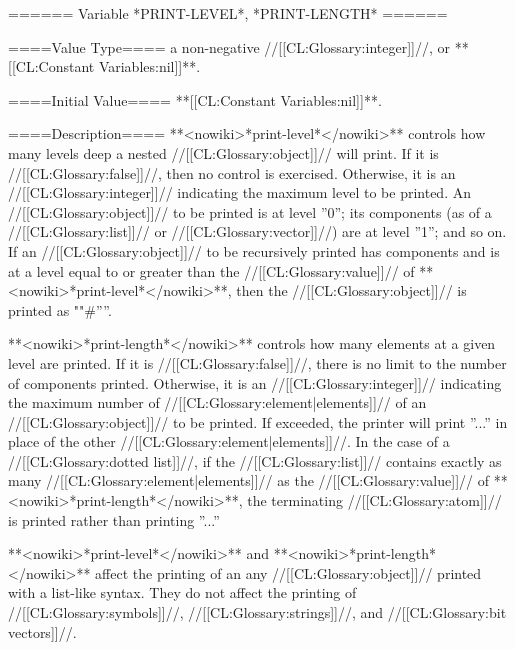 ====== Variable *PRINT-LEVEL*, *PRINT-LENGTH* ======

====Value Type====
a non-negative //[[CL:Glossary:integer]]//, or **[[CL:Constant Variables:nil]]**.

====Initial Value====
**[[CL:Constant Variables:nil]]**.

====Description====
**<nowiki>*print-level*</nowiki>** controls how many levels deep a nested //[[CL:Glossary:object]]// will print. If it is //[[CL:Glossary:false]]//, then no control is exercised. Otherwise, it is an //[[CL:Glossary:integer]]// indicating the maximum level to be printed. An //[[CL:Glossary:object]]// to be printed is at level ''0''; its components (as of a //[[CL:Glossary:list]]// or //[[CL:Glossary:vector]]//) are at level ''1''; and so on. If an //[[CL:Glossary:object]]// to be recursively printed has components and is at a level equal to or greater than the //[[CL:Glossary:value]]// of **<nowiki>*print-level*</nowiki>**, then the //[[CL:Glossary:object]]// is printed as ""#''''.

**<nowiki>*print-length*</nowiki>** controls how many elements at a given level are printed. If it is //[[CL:Glossary:false]]//, there is no limit to the number of components printed. Otherwise, it is an //[[CL:Glossary:integer]]// indicating the maximum number of //[[CL:Glossary:element|elements]]// of an //[[CL:Glossary:object]]// to be printed. If exceeded, the printer will print ''...'' in place of the other //[[CL:Glossary:element|elements]]//. In the case of a //[[CL:Glossary:dotted list]]//, if the //[[CL:Glossary:list]]// contains exactly as many //[[CL:Glossary:element|elements]]// as the //[[CL:Glossary:value]]// of **<nowiki>*print-length*</nowiki>**, the terminating //[[CL:Glossary:atom]]// is printed rather than printing ''...''

**<nowiki>*print-level*</nowiki>** and **<nowiki>*print-length*</nowiki>** affect the printing of an any //[[CL:Glossary:object]]// printed with a list-like syntax. They do not affect the printing of //[[CL:Glossary:symbols]]//, //[[CL:Glossary:strings]]//, and //[[CL:Glossary:bit vectors]]//.

